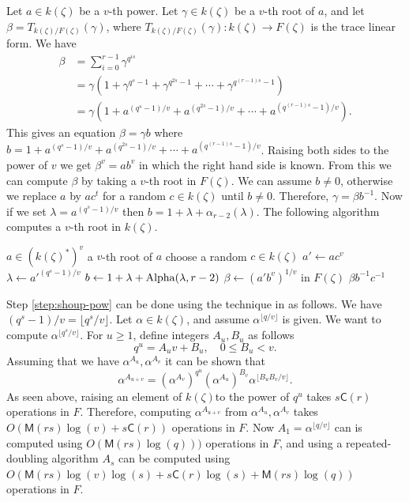 \documentclass[12pt]{article}
\theoremstyle{plain}
\theoremstyle{definition}
\def\MM{\ensuremath{\mathsf{M}}}
\def\CC{\ensuremath{\mathsf{C}}}
\newcounter{algorithm}
\begin{document}
Let $a \in k(\zeta)$ be a $v$-th power. Let $\gamma \in k(\zeta)$ be a $v$-th root of $a$, and 
let $\beta = T_{k(\zeta) / F(\zeta)}(\gamma)$, where $T_{k(\zeta) / F(\zeta)}(\gamma): 
k(\zeta) \to F(\zeta)$ is the trace linear form. We have
\begin{align*}
	\label{equation:tr-square}
	\beta 
	& = \sum_{i = 0}^{r - 1} \gamma^{q^{is}} \\
	& = \gamma(1 + \gamma^{q^s - 1} + \gamma^{q^{2s} - 1} + \cdots + \gamma^{q^{(r - 1)s} - 1}) \\
	& = \gamma(1 + a^{(q^s - 1) / v} + a^{(q^{2s} - 1) / v} + \cdots + a^{(q^{(r - 1)s} -1) / v}).
\end{align*}
This gives an equation $\beta = \gamma b$ where $b = 1 + a^{(q^s - 1) / v} + a^{(q^{2s} - 1) / v} + 
\cdots + a^{(q^{(r - 1)s} -1) / v}$. Raising both sides to the power of $v$ we get $\beta^v = ab^v$ 
in which the right hand side is known. From this we can compute $\beta$ by taking a $v$-th root in 
$F(\zeta)$. We can assume $b \ne 0$, otherwise we replace $a$ by $ac^t$ for a random $c \in 
k(\zeta)$ until $b \ne 0$. Therefore, $\gamma = \beta b^{-1}$. Now if we set $\lambda =
a^{(q^s - 1) / v}$ then $b = 1 + \lambda + \alpha_{r - 2}(\lambda)$. The following algorithm 
computes a $v$-th root in $k(\zeta)$.

\begin{algorithm}
	\label{algorithm:root-F1z}
	\begin{algorithmic}[1]
		\REQUIRE $a \in (k(\zeta)^*)^v$
		\ENSURE a $v$-th root of $a$
		\REPEAT
		\STATE choose a random $c \in k(\zeta)$
		\STATE\label{step:root-rand} $a'\leftarrow ac^v$
		\STATE\label{step:shoup-pow} $\lambda \leftarrow {a'}^{(q^s-1)/v}$
		\STATE\label{step:b-tr} $b \leftarrow 1+\lambda+{\rm Alpha}(\lambda, r-2)$
		\STATE $\beta \leftarrow (a'b^v)^{1/v}$ in $F(\zeta)$
		\RETURN $\beta b^{-1}c^{-1}$
	\end{algorithmic}
\end{algorithm}

Step \ref{step:shoup-pow} can be done using the technique in \cite[Lemma 14]{shoup94} as follows. 
We have $(q^s-1)/v = \lfloor q^s / v \rfloor$. Let $\alpha \in k(\zeta)$, and assume 
$\alpha^{\lfloor q / v \rfloor}$ is given. We want to compute $\alpha^{\lfloor q^s / v \rfloor}$. 
For $u \ge 1$, define integers $A_u, B_u$ as follows
\[q^u = A_uv + B_u, \quad 0\le B_u < v.\]
Assuming that we have $\alpha^{A_u}, \alpha^{A_v}$ it can be shown that
\[ \alpha^{A_{u + v}} = 
\left(\alpha^{A_v}\right)^{q^u}\left(\alpha^{A_u}\right)^{B_v}\alpha^{\lfloor B_uB_v / v \rfloor}. 
\]
As seen above, raising an element of $k(\zeta)$to the power of $q^u$ takes $s\CC(r)$ operations 
in $F$. Therefore, computing $\alpha^{A_{u + v}}$ from $\alpha^{A_u}, \alpha^{A_v}$ takes 
$O(\MM(rs)\log(v) + s\CC(r))$ operations in $F$. Now $A_1 = \alpha^{\lfloor q / v \rfloor}$ can is 
computed using $O(\MM(rs)\log(q)))$ operations in $F$, and using a repeated-doubling algorithm 
$A_s$ can be computed using $O(\MM(rs)\log(v)\log(s) + s\CC(r)\log(s) + \MM(rs)\log(q))$ operations 
in $F$.
\end{document}
